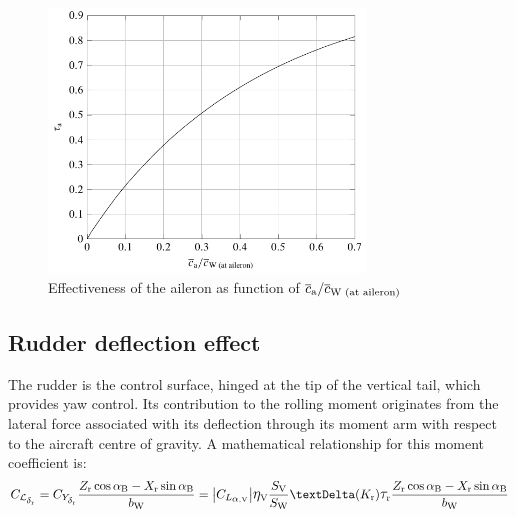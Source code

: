 \begin{figure}[H]
\centering
\includegraphics[width=0.75\textwidth]{Immagini/Capitolo2/4_55-Effectiveness_Aileron}
\caption[Effectiveness of the aileron] {Effectiveness of the aileron \tauail as function of $\overline c_\text a/\overline c_{\text {W (at aileron)}}$}
\label{tauaileron}
\end{figure}

\subsection{Rudder deflection effect}
\label{subsec2.2.3}

The rudder is the control surface, hinged at the tip of the vertical tail, which provides yaw control. Its contribution to the rolling moment originates from the lateral force associated with its deflection through its moment arm with respect to the aircraft centre of gravity. A mathematical relationship for this moment coefficient is:
\begin{equation}
\label{eq:rollRudder}
\CLdeltar = \CYdeltar \frac{\ZR \cos\alphaB - \XR \sin\alphaB}{\bW} = \big|\CLalphaV \big| \etaV \frac{\SV}{\SW} \textrm \textDelta (K_{\textrm r}) \taurud \frac{\ZR \cos\alphaB - \XR \sin\alphaB}{\bW}
\end{equation}

